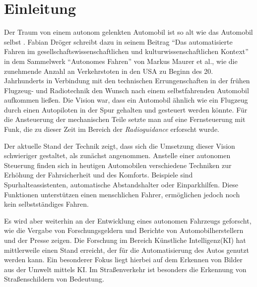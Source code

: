 \chapter{Einleitung}
\label{cha:Einleitung}
\setlength{\epigraphwidth}{4in}

Der Traum von einem autonom gelenkten Automobil ist so alt wie das Automobil selbst \cite{maurer_autonomes_2015}. Fabian Dröger schreibt dazu in seinem Beitrag "`Das automatisierte Fahren im gesellschaftswissenschaftlichen und kulturwissenschaftlichen Kontext"' in dem Sammelwerk "`Autonomes Fahren"' von Markus Maurer et al., wie die zunehmende Anzahl an Verkehrstoten in den USA zu Beginn des 20. Jahrhunderts in Verbindung mit den technischen Errungenschaften in der frühen Flugzeug- und Radiotechnik den Wunsch nach einem selbstfahrenden Automobil aufkommen ließen. Die Vision war, dass ein Automobil ähnlich wie ein Flugzeug durch einen Autopiloten in der Spur gehalten und gesteuert werden könnte. Für die Ansteuerung der mechanischen Teile setzte man auf eine Fernsteuerung mit Funk, die zu dieser Zeit im Bereich der \emph{Radioguidance} erforscht wurde.

Der aktuelle Stand der Technik zeigt, dass sich die Umsetzung dieser Vision schwieriger gestaltet, als zunächst angenommen. Anstelle einer autonomen Steuerung finden sich in heutigen Automobilen verschiedene Techniken zur Erhöhung der Fahrsicherheit und des Komforts. Beispiele sind Spurhalteassistenten, automatische Abstandshalter oder Einparkhilfen. Diese Funktionen unterstützen einen menschlichen Fahrer, ermöglichen jedoch noch kein selbstständiges Fahren.

Es wird aber weiterhin an der Entwicklung eines autonomen Fahrzeugs geforscht, wie die Vergabe von Forschungsgeldern\cite{bmbf-internetredaktion_auto_nodate} und Berichte von Automobilherstellern\cite{bmw_autonomes_nodate} und der Presse\cite{efler_autonomes_2018} zeigen. Die Forschung im Bereich Künstliche Intelligenz(KI) hat mittlerweile einen Stand erreicht, der für die Automatisierung des Autos genutzt werden kann. Ein besonderer Fokus liegt hierbei auf dem Erkennen von Bilder aus der Umwelt mittels KI. Im Straßenverkehr ist besonders die Erkennung von Straßenschildern von Bedeutung. 



